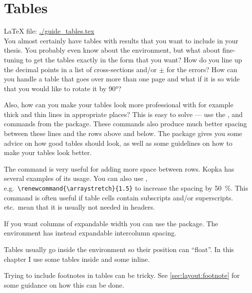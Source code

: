 
\chapter{Tables}%
\label{sec:table}

\LaTeX{} file: \url{./guide_tables.tex}\\[1ex]
\noindent
You almost certainly have tables with results that you want to include
in your thesis. You probably even know about the 
environment, but what about fine-tuning to get the tables exactly in
the form that you want? How do you line up the decimal points in a
list of cross-sections and/or \(\pm\) for the errors? How can you
handle a table that goes over more than one page and what if it is so
wide that you would like to rotate it by \ang{90}?

Also, how can you make your tables look more professional with for
example thick and thin lines in appropriate places? This is easy to
solve --- use the ,  and 
commands from the  package. These commands also
produce much better spacing between these lines and the rows above and
below. The  package gives you some advice on how
good tables should look, as well as some guidelines on how to make your
tables look better.

The  command is very useful for adding more space between
rows. Kopka has several examples of its usage. You can also use
, e.g.\ \verb+\renewcommand{\arraystretch}{1.5}+ to
increase the spacing by \SI{50}{\percent}. This command is often useful if table
cells contain subscripts and/or superscripts. 
etc.\ mean that it is usually not needed in headers.

If you want columns of expandable width you can use the
 package. The environment  has instead
expandable intercolumn spacing.

Tables usually go inside the  environment so their position
can \enquote{float}. In this chapter I use some tables inside 
and some inline.

Trying to include footnotes in tables can be tricky.
See \cref{sec:layout:footnote} for some guidance on how this can be done.


